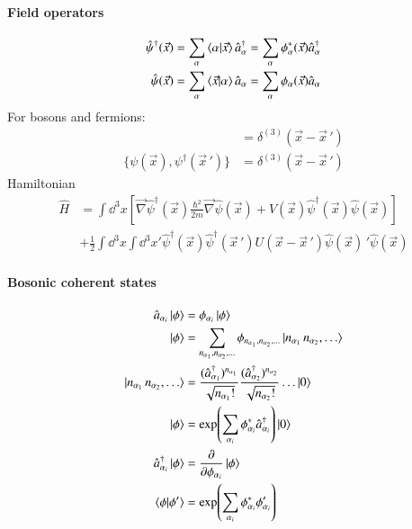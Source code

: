 \paragraph{Field operators}
\begin{align}
	\hat{\psi}^\dagger(\vec{x}) &= \sum_\alpha \braket{\alpha | \vec{x}} \hat{a}^\dagger_\alpha = \sum_\alpha \phi^*_\alpha(\vec{x})\hat{a}^\dagger_\alpha \\	
	\hat{\psi}(\vec{x}) &= \sum_\alpha \braket{ \vec{x}| \alpha } \hat{a}_\alpha = \sum_\alpha \phi_\alpha(\vec{x})\hat{a}_\alpha
\end{align}
For bosons and fermions:
\begin{align}
	[\psi(\vec{x}), \psi^\dagger(\vec{x}\,')] &= \delta^{(3)}(\vec{x}-\vec{x}\,') \\
	\{\psi(\vec{x}), \psi^\dagger(\vec{x}\,')\} &= \delta^{(3)}(\vec{x}-\vec{x}\,') 
\end{align}
Hamiltonian
\begin{align}
	\hat{H} &= \int\dd^3x \left[ \vec{\nabla} \hat{\psi}^\dagger(\vec{x})\frac{\hbar^2}{2m}\vec{\nabla}\hat{\psi}(\vec{x}) + V(\vec{x})\hat{\psi}^\dagger(\vec{x})\hat{\psi}(\vec{x}) \right] \\
	&+ \frac{1}{2} \int\dd^3x \int\dd^3x' \hat{\psi}^\dagger(\vec{x})\hat{\psi}^\dagger(\vec{x}\,') U(\vec{x}-\vec{x}\,') \hat{\psi}(\vec{x})\,' \hat{\psi}(\vec{x})
\end{align}

\paragraph{Bosonic coherent states}
\begin{align}
	\hat{a}_{\alpha_i} \ket{\phi} &= \phi_{\alpha_i} \ket{\phi} \\
	\ket{\phi} &= \sum_{n_{\alpha_1},  n_{\alpha_2}, \dots} \phi_{n_{\alpha_1}, n_{\alpha_2}, \dots} \ket{n_{\alpha_1} \, n_{\alpha_2}, \dots} \\
	\ket{n_{\alpha_1} \, n_{\alpha_2}, \dots} &= \frac{(\hat{a}_{\alpha_1}^\dagger)^{n_{\alpha_1}}}{\sqrt{n_{\alpha_1}!}} \frac{(\hat{a}_{\alpha_2}^\dagger)^{n_{\alpha_2}}}{\sqrt{n_{\alpha_2}!}} \dots \ket{0} \\
	\ket{\phi} &= \exp(\sum_{\alpha_i}\phi^*_{\alpha_i} \hat{a}_{\alpha_i}^\dagger) \ket{0} \\
	\hat{a}^\dagger_{\alpha_i} \ket{\phi} &= \frac{\partial}{\partial \phi_{\alpha_i}} \ket{\phi} \\
	\braket{\phi | \phi '} &= \exp(\sum_{\alpha_i}\phi_{\alpha_i}^* \phi_{\alpha_i}')
\end{align}

